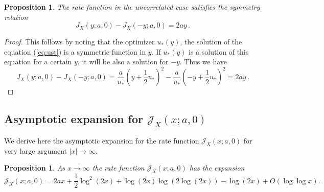 \documentclass[11pt]{article}
\numberwithin{equation}{section}
\theoremstyle{plain}
\newtheorem{proposition}[theorem]{Proposition}
\begin{document}
\begin{proposition}\label{prop:Isymm}
The rate function in the uncorrelated case satisfies the symmetry relation
\begin{equation}
J_X(y;a,0) - J_X(-y;a,0) = 2ay\,.
\end{equation}
\end{proposition}

\begin{proof}
This follows by noting that the optimizer $u_*(y)$, the solution of the equation (\ref{eq:ust}) is a symmetric function in $y$.  If $u_*(y)$ is a solution of this equation
for a certain $y$, it will be also a solution for $-y$. Thus we have
\begin{equation}
J_X(y;a,0) - J_X(-y;a,0) = \frac{a}{u_*} \left(y+\frac12 u_*\right)^2 - \frac{a}{u_*}\left(-y + \frac12 u_*\right)^2 = 2ay\,.
\end{equation}
\end{proof}




\subsection{Asymptotic expansion for $\mathcal{J}_X(x;a,0)$}

We derive here the asymptotic expansion for the rate function
$\mathcal{J}_X(x;a,0)$ for very large argument $|x| \to \infty$.

\begin{proposition}\label{prop:JXasympt}
As $x\to \infty$ the rate function $\mathcal{J}_X(x;a,0)$
has the expansion
\begin{equation}\label{Jlargex}
\mathcal{J}_X(x;a,0) = 2a x + \frac12 \log^2(2x) 
+ \log(2x)\log(2\log(2x)) 
- \log(2x) + O(\log\log x).
\end{equation}
\end{proposition}
\end{document}
